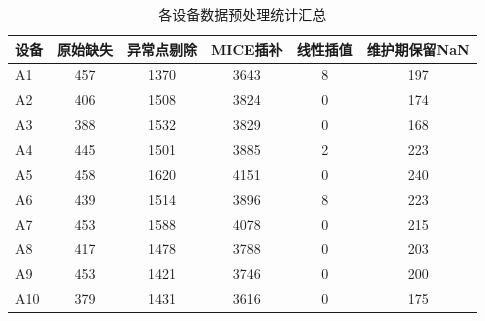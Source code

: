 \documentclass{article}
\begin{document}
	
	
	\begin{table}[h]
		\centering
		\setlength{\tabcolsep}{6pt}
		\renewcommand{\arraystretch}{1.2}
		\caption{各设备数据预处理统计汇总}
		\label{tab:预处理统计}
		\begin{tabular}{lccccc}
			\toprule
			\textbf{设备} & \textbf{原始缺失} & \textbf{异常点剔除} & \textbf{MICE插补} & \textbf{线性插值} & \textbf{维护期保留NaN} \\
			\midrule
			\rowcolor{LightBlue}
			A1 & 457 & 1370 & 3643 & 8 & 197 \\
			A2 & 406 & 1508 & 3824 & 0 & 174 \\
			\rowcolor{LightBlue}
			A3 & 388 & 1532 & 3829 & 0 & 168 \\
			A4 & 445 & 1501 & 3885 & 2 & 223 \\
			\rowcolor{LightBlue}
			A5 & 458 & 1620 & 4151 & 0 & 240 \\
			A6 & 439 & 1514 & 3896 & 8 & 223 \\
			\rowcolor{LightBlue}
			A7 & 453 & 1588 & 4078 & 0 & 215 \\
			A8 & 417 & 1478 & 3788 & 0 & 203 \\
			\rowcolor{LightBlue}
			A9 & 453 & 1421 & 3746 & 0 & 200 \\
			A10 & 379 & 1431 & 3616 & 0 & 175 \\
			\bottomrule
		\end{tabular}
	\end{table}
	
	
\end{document}
